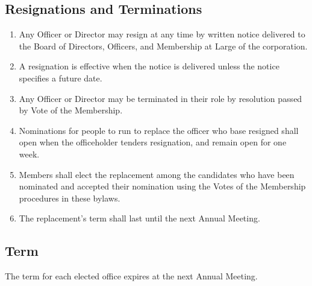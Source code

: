 \documentclass{article}
\begin{document}
  \subsection{Resignations and Terminations}
    \begin{enumerate}
      \item Any Officer or Director may resign at any time by written notice delivered to the
      Board of Directors, Officers, and Membership at Large of the corporation.
      \item A resignation is effective when the notice is delivered unless the notice specifies a
      future date.
      \item Any Officer or Director may be terminated in their role by resolution passed by Vote
      of the Membership.
      \item Nominations for people to run to replace the officer who base resigned shall open
      when the officeholder tenders resignation, and remain open for one week.
      \item Members shall elect the replacement among the candidates who have been
      nominated and accepted their nomination using the Votes of the Membership procedures
      in these bylaws.
      \item The replacement's term shall last until the next Annual Meeting.
    \end{enumerate}
  \subsection{Term}
    The term for each elected office expires at the next Annual Meeting.
\end{document}
